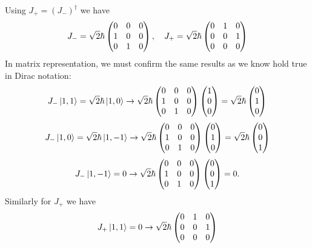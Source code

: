 \documentclass[11pt,letterpaper]{article}
\begin{document}
\begin{enumerate}[label=\Roman*.]
		\ea
		Using $J_+ = (J_-)^\dag$ we have
		\[
			J_- = \sqrt 2\hbar \begin{pmatrix}0&0&0\\1&0&0\\0&1&0\end{pmatrix},\quad
			J_+ = \sqrt 2\hbar \begin{pmatrix}0&1&0\\0&0&1\\0&0&0\end{pmatrix}
		\]
		In matrix representation, we must confirm the same results as we know hold true in Dirac notation:
		\[
			J_-\ket{1,1} = \sqrt 2\hbar\ket{1,0} \to  \sqrt 2\hbar \begin{pmatrix}0&0&0\\1&0&0\\0&1&0\end{pmatrix}
			\begin{pmatrix}1\\0\\0\end{pmatrix} = \sqrt 2\hbar \begin{pmatrix}0\\1\\0\end{pmatrix}
		\]
		\[
			J_-\ket{1,0} = \sqrt 2\hbar\ket{1,-1} \to  \sqrt 2\hbar \begin{pmatrix}0&0&0\\1&0&0\\0&1&0\end{pmatrix}
			\begin{pmatrix}0\\1\\0\end{pmatrix} = \sqrt 2\hbar \begin{pmatrix}0\\0\\1\end{pmatrix}
		\]
		\[
			J_-\ket{1,-1} = 0  \to  \sqrt 2\hbar \begin{pmatrix}0&0&0\\1&0&0\\0&1&0\end{pmatrix}
			\begin{pmatrix}0\\0\\1\end{pmatrix} = 0 .
		\]
		Similarly for $J_+$ we have
		\[
			J_+\ket{1,1} = 0 \to \sqrt 2\hbar \begin{pmatrix}0&1&0\\0&0&1\\0&0&0\end{pmatrix}
\]
\end{enumerate}
\end{document}
